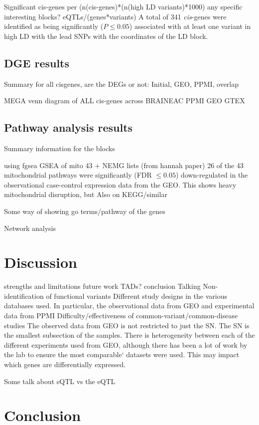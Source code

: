 \documentclass{article}
\begin{document}
Significant cis-genes per (n(cis-genes)*(n(high LD variants)*1000)
any specific interesting blocks?
eQTLs/(genes*variants)
A total of 341 \textit{cis}-genes were identified as being significantly ($P \leq 0.05$) associated with at least one variant in high LD with the lead SNPs with the coordinates of the LD block.


\subsection{DGE results}

Summary for all cisgenes, are the DEGs or not:
Initial, GEO, PPMI, overlap


MEGA venn diagram of ALL cis-genes across BRAINEAC PPMI GEO GTEX

\subsection{Pathway analysis results}
Summary information for the blocks

using fgsea
GSEA of mito 43 + NEMG lists (from hannah paper)
26 of the 43 mitochondrial pathways were significantly (FDR $\leq0.05$) down-regulated in the observational case-control expression data from the GEO. This shows heavy mitochondrial disruption, but
Also on KEGG/similar

Some way of showing go terms/pathway of the genes

Network analysis

\section{Discussion}

strengths and limitations
future work
TADs?
conclusion
Talking
Non-identification of functional variants
Different study designs in the various databases used. In particular, the observational data from GEO and experimental data from PPMI 
Difficulty/effectiveness of common-variant/common-disease studies
The observed data from GEO is not restricted to just the SN. The SN is the smallest subsection of the samples. 
There is heterogeneity between each of the different experiments used from GEO, although there has been a lot of work by the lab to ensure the most comparable` datasets were used. 
This may impact which genes are differentially expressed.

Some talk about sQTL vs the eQTL

\section{Conclusion}




\end{document}
